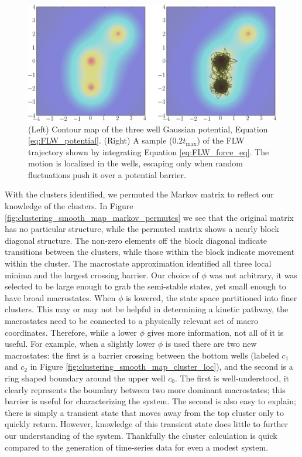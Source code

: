 \begin{figure}[tb]
  \includegraphics[width=.8\textwidth]{supplement/smooth_potential_cluster/pictures/smooth_potential_traj.png}
  \caption{(Left) Contour map of the three well Gaussian potential, Equation \ref{eq:FLW_potential}. (Right) A sample ($0.2 t_{\text{max}}$) of the FLW trajectory shown by integrating Equation \ref{eq:FLW_force_eq}. The motion is localized in the wells, escaping only when random fluctuations push it over a potential barrier.}
  \label{fig:clustering_smooth_map_traj}
\end{figure}
%
With the clusters identified, we permuted the Markov matrix to reflect our knowledge of the clusters. In Figure 
\ref{fig:clustering_smooth_map_markov_permutes} we see that the original matrix has no particular structure, while the permuted matrix shows a nearly block diagonal structure. The non-zero elements off the block diagonal indicate transitions between the clusters, while those within the block indicate movement within the cluster. The macrostate approximation identified all three local minima and the largest crossing barrier. Our choice of $\phi$ was not arbitrary, it was selected to be large enough to grab the semi-stable states, yet small enough to have broad macrostates. When $\phi$ is lowered, the state space partitioned into finer clusters. This may or may not be helpful in determining a kinetic pathway, the macrostates need to be connected to a physically relevant set of macro coordinates. Therefore, while a lower $\phi$ gives more information, not all of it is useful. For example, when a slightly lower $\phi$ is used there are two new macrostates: the first is a barrier crossing between the bottom wells (labeled $c_1$ and $c_2$ in Figure \ref{fig:clustering_smooth_map_cluster_loc}), and the second is a ring shaped boundary around the upper well $c_0$. The first is well-understood, it clearly represents the boundary between two more dominant macrostates; this barrier is useful for characterizing the system. The second is also easy to explain; there is simply a transient state that moves away from the top cluster only to quickly return. However, knowledge of this transient state does little to further our understanding of the system. Thankfully the cluster calculation is quick compared to the generation of time-series data for even a modest system. 


